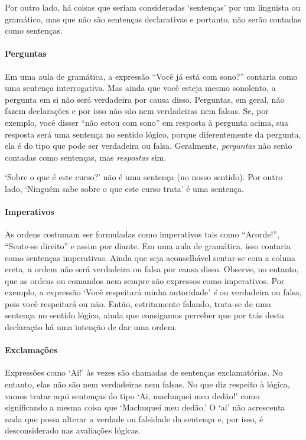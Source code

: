 Por outro lado, há coisas que seriam consideradas `sentenças' por um linguista ou gramático, mas que não são sentenças declarativas e portanto, não serão contadas como sentenças.

\paragraph{Perguntas}  Em uma aula de gramática, a expressão ``Você já está com sono?'' contaria como uma sentença interrogativa. Mas ainda que você esteja mesmo sonolento, a pergunta em si não será verdadeira por causa disso.
Perguntas, em geral, não fazem declarações e por isso não são nem verdadeiras nem falsas.
Se, por exemplo, você disser ``não estou com sono'' em resposta à pergunta acima, sua resposta será uma sentença no sentido lógico, porque diferentemente da pergunta, ela é do tipo que pode ser verdadeira ou falsa.
Geralmente, \emph{perguntas} não serão contadas como sentenças, mas \emph{respostas} sim.

`Sobre o que é este curso?' não é uma sentença (no nosso sentido).
Por outro lado, `Ninguém sabe sobre o que este curso trata' é uma sentença.

\paragraph{Imperativos} As ordens costumam ser formuladas como imperativos tais como ``Acorde!'', ``Sente-se direito'' e assim por diante.
Em uma aula de gramática, isso contaria como sentenças imperativas.
Ainda que seja aconselhável sentar-se com a coluna ereta, a ordem não será verdadeira ou falsa por causa disso.
Observe, no entanto, que as ordens ou comandos nem sempre são expressos como imperativos.
Por exemplo, a expressão `Você respeitará minha autoridade' \emph{é} ou verdadeira ou falsa, pois você respeitará ou não.
Então, estritamente falando, trata-se de uma sentença no sentido lógico, ainda que consigamos perceber que por trás desta declaração há uma intenção de dar uma ordem.

\paragraph{Exclamações} Expressões como `Ai!' às vezes são chamadas de sentenças exclamatórias.
No entanto, elas não são nem verdadeiras nem falsas.
No que diz respeito à lógica, vamos tratar aqui sentenças do tipo `Ai, machuquei meu dedão!' como significando a mesma coisa que `Machuquei meu dedão.'
O `ai' não acrescenta nada que possa alterar a verdade ou falsidade da sentença e, por isso, é desconsiderado nas avaliações lógicas.


